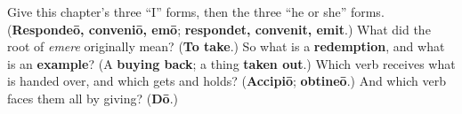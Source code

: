 \begin{tcolorbox}[breakable,colback=teal!4,colframe=teal!35!black,title={Before you move on}]
Give this chapter's three \textquotedblleft{}I\textquotedblright{} forms, then the three \textquotedblleft{}he or she\textquotedblright{} forms. (\textbf{Respondeō, conveniō, emō}; \textbf{respondet, convenit, emit}.) What did the root of \emph{emere} originally mean? (\textbf{To take}.) So what is a \textbf{redemption}, and what is an \textbf{example}? (A \textbf{buying back}; a thing \textbf{taken out}.) Which verb receives what is handed over, and which gets and holds? (\textbf{Accipiō}; \textbf{obtineō}.) And which verb faces them all by giving? (\textbf{Dō}.)
\end{tcolorbox}
